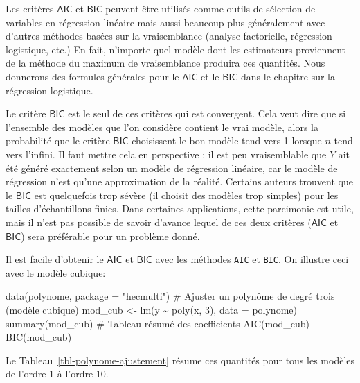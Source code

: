 \documentclass[
  11pt,
  letterpaper,
]{scrbook}
\newenvironment{Shaded}{\begin{snugshade}}{\end{snugshade}}
\newcommand{\AttributeTok}[1]{\textcolor[rgb]{0.40,0.45,0.13}{#1}}
\newcommand{\CommentTok}[1]{\textcolor[rgb]{0.37,0.37,0.37}{#1}}
\newcommand{\DecValTok}[1]{\textcolor[rgb]{0.68,0.00,0.00}{#1}}
\newcommand{\FunctionTok}[1]{\textcolor[rgb]{0.28,0.35,0.67}{#1}}
\newcommand{\NormalTok}[1]{\textcolor[rgb]{0.00,0.23,0.31}{#1}}
\newcommand{\OtherTok}[1]{\textcolor[rgb]{0.00,0.23,0.31}{#1}}
\newcommand{\SpecialCharTok}[1]{\textcolor[rgb]{0.37,0.37,0.37}{#1}}
\newcommand{\StringTok}[1]{\textcolor[rgb]{0.13,0.47,0.30}{#1}}
\theoremstyle{definition}
\theoremstyle{remark}
\begin{document}
Les critères \(\mathsf{AIC}\) et \(\mathsf{BIC}\) peuvent être utilisés
comme outils de sélection de variables en régression linéaire mais aussi
beaucoup plus généralement avec d'autres méthodes basées sur la
vraisemblance (analyse factorielle, régression logistique, etc.) En
fait, n'importe quel modèle dont les estimateurs proviennent de la
méthode du maximum de vraisemblance produira ces quantités. Nous
donnerons des formules générales pour le \(\mathsf{AIC}\) et le
\(\mathsf{BIC}\) dans le chapitre sur la régression logistique.

Le critère \(\mathsf{BIC}\) est le seul de ces critères qui est
convergent. Cela veut dire que si l'ensemble des modèles que l'on
considère contient le vrai modèle, alors la probabilité que le critère
\(\mathsf{BIC}\) choisissent le bon modèle tend vers 1 lorsque \(n\)
tend vers l'infini. Il faut mettre cela en perspective : il est peu
vraisemblable que \(Y\) ait été généré exactement selon un modèle de
régression linéaire, car le modèle de régression n'est qu'une
approximation de la réalité. Certains auteurs trouvent que le
\(\mathsf{BIC}\) est quelquefois trop sévère (il choisit des modèles
trop simples) pour les tailles d'échantillons finies. Dans certaines
applications, cette parcimonie est utile, mais il n'est pas possible de
savoir d'avance lequel de ces deux critères (\(\mathsf{AIC}\) et
\(\mathsf{BIC}\)) sera préférable pour un problème donné.

Il est facile d'obtenir le \(\mathsf{AIC}\) et \(\mathsf{BIC}\) avec les
méthodes \texttt{AIC} et \texttt{BIC}. On illustre ceci avec le modèle
cubique:

\begin{Shaded}
\begin{Highlighting}[]
\FunctionTok{data}\NormalTok{(polynome, }\AttributeTok{package =} \StringTok{"hecmulti"}\NormalTok{)}
\CommentTok{\# Ajuster un polynôme de degré trois (modèle cubique)}
\NormalTok{mod\_cub }\OtherTok{\textless{}{-}} \FunctionTok{lm}\NormalTok{(y }\SpecialCharTok{\textasciitilde{}} \FunctionTok{poly}\NormalTok{(x, }\DecValTok{3}\NormalTok{),}
              \AttributeTok{data =}\NormalTok{ polynome)}
\FunctionTok{summary}\NormalTok{(mod\_cub) }\CommentTok{\# Tableau résumé des coefficients}
\FunctionTok{AIC}\NormalTok{(mod\_cub)}
\FunctionTok{BIC}\NormalTok{(mod\_cub)}
\end{Highlighting}
\end{Shaded}

Le Tableau~\ref{tbl-polynome-ajustement} résume ces quantités pour tous
les modèles de l'ordre 1 à l'ordre 10.
\end{document}

